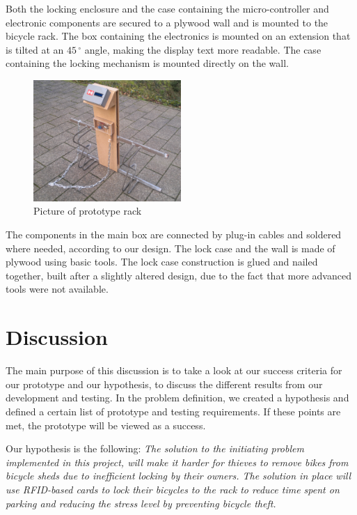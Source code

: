 \documentclass[twoside]{article}
\begin{document}
\begin{multicols}{2}
Both the locking enclosure and the case containing the micro-controller and electronic components are secured to a plywood wall and is mounted to the bicycle rack. The box containing the electronics is mounted on an extension that is tilted at an $45\,^{\circ}$ angle, making the display text more readable. The case containing the locking mechanism is mounted directly on the wall.

\begin{figure}[H]
	\centering
	\includegraphics[width=0.5\textwidth]{images/full.jpg}
	\caption{Picture of prototype rack}
	\label{fig.rack}
\end{figure}

The components in the main box are connected by plug-in cables and soldered where needed, according to our design. The lock case and the wall is made of plywood using basic tools. The lock case construction is glued and nailed together, built after a slightly altered design, due to the fact that more advanced tools were not available. 


\section{Discussion}
The main purpose of this discussion is to take a look at our success criteria for our prototype and our hypothesis, to discuss the different results from our development and testing. In the problem definition, we created a hypothesis and defined a certain list of prototype and testing requirements. If these points are met, the prototype will be viewed as a success.

Our hypothesis is the following: 
\textit{The solution to the initiating problem implemented in this project, will make it harder for thieves to remove bikes from bicycle sheds due to inefficient locking by their owners. The solution in place will use RFID-based cards to lock their bicycles to the rack to reduce time spent on parking and reducing the stress level by preventing bicycle theft.}


\end{multicols}
\end{document}
